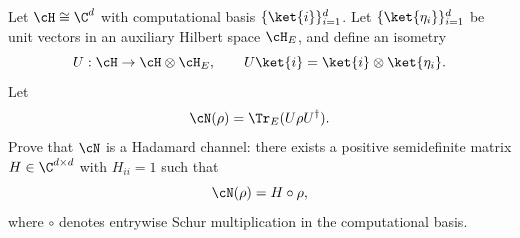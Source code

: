 Let $\cH\cong\C^d$ with computational basis $\{\ket{i}\}_{i=1}^d$. Let $\{\ket{\eta_i}\}_{i=1}^d$ be unit vectors in an auxiliary Hilbert space $\cH_E$, and define an isometry
$$
U:\cH\to\cH\otimes\cH_E,
\qquad
U\ket{i}=\ket{i}\otimes\ket{\eta_i}.
$$
Let
$$
\cN(\rho)=\Tr_E(U\rho U^\dagger).
$$
Prove that $\cN$ is a Hadamard channel: there exists a positive semidefinite matrix $H\in\C^{d\times d}$ with $H_{ii}=1$ such that
$$
\cN(\rho)=H\circ\rho,
$$
where $\circ$ denotes entrywise Schur multiplication in the computational basis.
